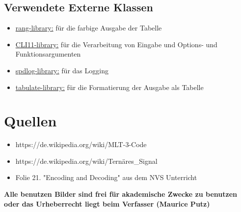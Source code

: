 \documentclass{article}
\begin{document}
\subsection{Verwendete Externe Klassen}
\begin{itemize}
	\item \underline{rang-library:} für die farbige Ausgabe der Tabelle
	\item \underline{CLI11-library:} für die Verarbeitung von Eingabe und Options- und Funktionsargumenten
	\item \underline{spdlog-library:} für das Logging
	\item \underline{tabulate-library:} für die Formatierung der Ausgabe als Tabelle
\end{itemize}


\section{Quellen}

\begin{itemize}
	\item https://de.wikipedia.org/wiki/MLT-3-Code
	\item https://de.wikipedia.org/wiki/Ternäres\_Signal
	\item Folie 21. "Encoding and Decoding" aus dem NVS Unterricht
\end{itemize}

\textbf{Alle benutzen Bilder sind frei für akademische Zwecke zu benutzen oder das Urheberrecht liegt beim Verfasser (Maurice Putz)}
\end{document}
